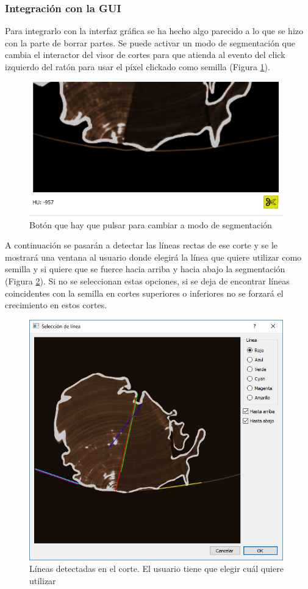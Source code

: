 \subsubsection{Integración con la GUI}

Para integrarlo con la interfaz gráfica se ha hecho algo parecido a lo que se hizo con la parte de borrar partes. Se puede activar un modo de segmentación que cambia el interactor del visor de cortes para que atienda al evento del click izquierdo del ratón para usar el píxel clickado como semilla (Figura \ref{fig:desarrollo/gui-segmentacion}).

\begin{figure}[H]
	\centering
	\includegraphics[width=11cm]{imagenes/desarrollo/gui-segmentacion}
	\caption{Botón que hay que pulsar para cambiar a modo de segmentación}
	\label{fig:desarrollo/gui-segmentacion}
\end{figure}

A continuación se pasarán a detectar las líneas rectas de ese corte y se le mostrará una ventana al usuario donde elegirá la línea que quiere utilizar como semilla y si quiere que se fuerce hacia arriba y hacia abajo la segmentación (Figura \ref{fig:desarrollo/gui-segmentacion-linea}). Si no se seleccionan estas opciones, si se deja de encontrar líneas coincidentes con la semilla en cortes superiores o inferiores no se forzará el crecimiento en estos cortes.

\begin{figure}[H]
	\centering
	\includegraphics[width=11cm]{imagenes/desarrollo/gui-segmentacion-linea}
	\caption{Líneas detectadas en el corte. El usuario tiene que elegir cuál quiere utilizar}
	\label{fig:desarrollo/gui-segmentacion-linea}
\end{figure}

